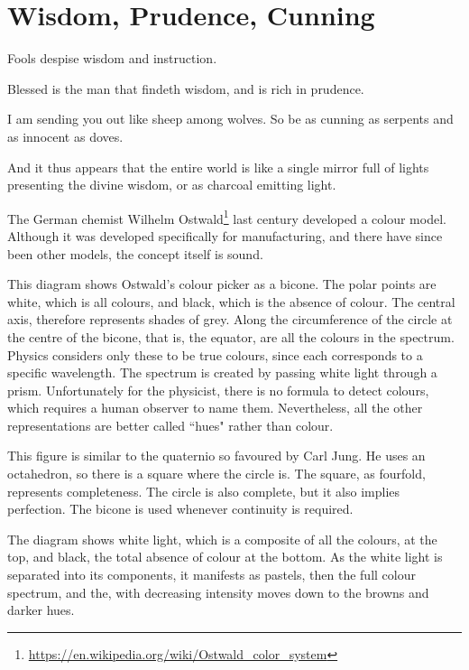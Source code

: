 \section{Wisdom, Prudence, Cunning}

\begin{quotex}
Fools despise wisdom and instruction. 

Blessed is the man that findeth wisdom, and is rich in prudence. 

I am sending you out like sheep among wolves. So be as cunning as serpents and as innocent as doves. 

And it thus appears that the entire world is like a single mirror full of lights presenting the divine wisdom, or as
charcoal emitting light. 

\end{quotex}

The German chemist Wilhelm Ostwald\footnote{\url{https://en.wikipedia.org/wiki/Ostwald_color_system}} last century developed a colour model. Although it was
developed specifically for manufacturing, and there have since been other models, the concept itself is sound.

This diagram shows Ostwald's colour picker as a bicone. The polar points are white, which is all
colours, and black, which is the absence of colour. The central axis, therefore represents shades of grey. Along the
circumference of the circle at the centre of the bicone, that is, the equator, are all the colours in the spectrum.
Physics considers only these to be true colours, since each corresponds to a specific wavelength. The spectrum is
created by passing white light through a prism. Unfortunately for the physicist, there is no formula to detect colours,
which requires a human observer to name them. Nevertheless, all the other representations are better called ``hues"
rather than colour.

This figure is similar to the quaternio so favoured by Carl Jung. He uses an octahedron, so there is a square where the
circle is. The square, as fourfold, represents completeness. The circle is also complete, but it also implies
perfection. The bicone is used whenever continuity is required.

The diagram shows white light, which is a composite of all the colours, at the top, and black, the total absence of
colour at the bottom. As the white light is separated into its components, it manifests as pastels, then the full
colour spectrum, and the, with decreasing intensity moves down to the browns and darker hues.

